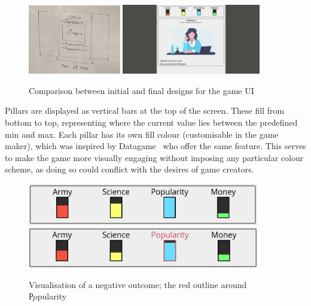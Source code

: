 \begin{figure}[!h]
	\centering
	\includegraphics[width=0.36\textwidth]{./images/design/game_drawing.jpg}
	\includegraphics[width=0.54\textwidth]{./images/design/game.png}
	\caption{Comparison between initial and final designs for the game UI}
	\label{fig:game_comp}
\end{figure}

Pillars are displayed as vertical bars at the top of the screen. 
These fill from bottom to top, representing where the current value lies between the predefined min and max.
Each pillar has its own fill colour (customisable in the game maker), which was inspired by Datagame~\cite{Datagame} who offer the same feature. This serves to make the game more visually engaging without imposing any particular colour scheme, as doing so could conflict with the desires of game creators.

\begin{figure}[!h]
	\centering
	\includegraphics[width=0.9\textwidth]{./images/design/pillars.png}
	\includegraphics[width=0.9\textwidth]{./images/design/hover.png}
	\caption{Visualisation of a negative outcome; the red outline around \c{Popularity} }
	\label{fig:colour_comp}
\end{figure}

